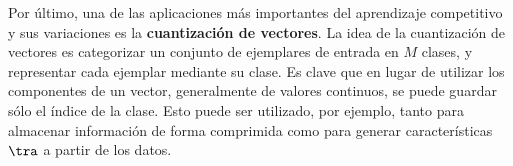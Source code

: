 

Por último, una de las aplicaciones más importantes del aprendizaje competitivo y sus variaciones es la \textbf{cuantización de vectores}. La idea de la cuantización de vectores es categorizar un conjunto de ejemplares de entrada en $M$ clases, y representar cada ejemplar mediante su clase. Es clave que en lugar de utilizar los componentes de un vector, generalmente de valores continuos, se puede guardar sólo el índice de la clase. Esto puede ser utilizado, por ejemplo, tanto para almacenar información de forma comprimida como para generar características $\tra$ a partir de los datos. 